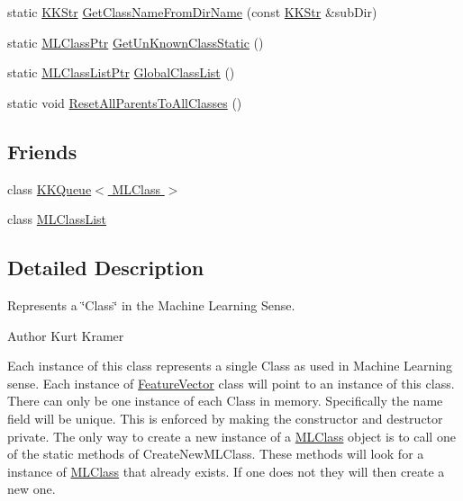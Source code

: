 \begin{DoxyCompactItemize}
\item 
static \hyperlink{class_k_k_b_1_1_k_k_str}{K\+K\+Str} \hyperlink{class_k_k_m_l_l_1_1_m_l_class_a7e2cfcd8b8ad56e2822668f96c7f8d1e}{Get\+Class\+Name\+From\+Dir\+Name} (const \hyperlink{class_k_k_b_1_1_k_k_str}{K\+K\+Str} \&sub\+Dir)
\item 
static \hyperlink{namespace_k_k_m_l_l_ac272393853d59e72e8456f14cd6d8c23}{M\+L\+Class\+Ptr} \hyperlink{class_k_k_m_l_l_1_1_m_l_class_adb5daed2642585c91e0cdc5e9d472c7e}{Get\+Un\+Known\+Class\+Static} ()
\item 
static \hyperlink{namespace_k_k_m_l_l_af091cde3f4a4315658b41a5e7583fc26}{M\+L\+Class\+List\+Ptr} \hyperlink{class_k_k_m_l_l_1_1_m_l_class_ad7727a26d90f35f551d3f58b5df3520f}{Global\+Class\+List} ()
\item 
static void \hyperlink{class_k_k_m_l_l_1_1_m_l_class_a2d10edae758c3780487e44ad91a34139}{Reset\+All\+Parents\+To\+All\+Classes} ()
\end{DoxyCompactItemize}
\subsection*{Friends}
\begin{DoxyCompactItemize}
\item 
class \hyperlink{class_k_k_m_l_l_1_1_m_l_class_a51bf46485affc430ffb996a9e88c0ad5}{K\+K\+Queue$<$ M\+L\+Class $>$}
\item 
class \hyperlink{class_k_k_m_l_l_1_1_m_l_class_aebbe3bcd525e27070e7cc765528293b5}{M\+L\+Class\+List}
\end{DoxyCompactItemize}


\subsection{Detailed Description}
Represents a \char`\"{}\+Class\char`\"{} in the Machine Learning Sense. 

\begin{DoxyAuthor}{Author}
Kurt Kramer
\end{DoxyAuthor}
Each instance of this class represents a single Class as used in Machine Learning sense. Each instance of \textquotesingle{}\hyperlink{class_k_k_m_l_l_1_1_feature_vector}{Feature\+Vector}\textquotesingle{} class will point to an instance of this class. There can only be one instance of each Class in memory. Specifically the \textquotesingle{}name\textquotesingle{} field will be unique. This is enforced by making the constructor and destructor private. The only way to create a new instance of a \textquotesingle{}\hyperlink{class_k_k_m_l_l_1_1_m_l_class}{M\+L\+Class}\textquotesingle{} object is to call one of the static methods of \textquotesingle{}Create\+New\+M\+L\+Class\textquotesingle{}. These methods will look for a instance of \textquotesingle{}\hyperlink{class_k_k_m_l_l_1_1_m_l_class}{M\+L\+Class}\textquotesingle{} that already exists. If one does not they will then create a new one.

